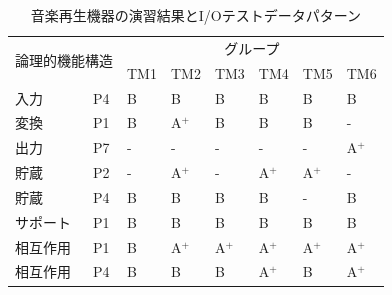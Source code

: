 \begin{table}[htbp]
  \centering
\caption{音楽再生機器の演習結果とI/Oテストデータパターン}
    \begin{tabular}{|l|l|l|l|l|l|l|l|}
    \hline
    \multicolumn{2}{|c|}{\multirow{2}[4]{*}{論理的機能構造}} & \multicolumn{6}{c|}{グループ} \bigstrut\\
\cline{3-8}    \multicolumn{2}{|c|}{} & TM1   & TM2   & TM3   & TM4   & TM5   & TM6 \bigstrut\\
    \hline
    \hline
    入力 & P4    & B     & B     & B     & B     & B     & B \bigstrut\\
    \hline
    変換 & P1    & B     & A${}^\text{+}$    & B     & B     & B     & - \bigstrut\\
    \hline
    出力 & P7    & -     & -     & -     & -     & -     & A${}^\text{+}$ \bigstrut\\
    \hline
    貯蔵 & P2    & -     & A${}^\text{+}$    & -     & A${}^\text{+}$    & A${}^\text{+}$    & - \bigstrut\\
    \hline
    貯蔵 & P4    & B     & B     & B     & B     & -     & B \bigstrut\\
    \hline
    サポート & P1    & B     & B     & B     & B     & B     & B \bigstrut\\
    \hline
    相互作用 & P1    & B     & A${}^\text{+}$    & A${}^\text{+}$    & A${}^\text{+}$    & A${}^\text{+}$    & A${}^\text{+}$ \bigstrut\\
    \hline
    相互作用 & P4    & B     & B     & B     & A${}^\text{+}$    & B     & A${}^\text{+}$ \bigstrut\\
    \hline
    \end{tabular}%
\label{tab:D-4-tab7}%
\end{table}%

